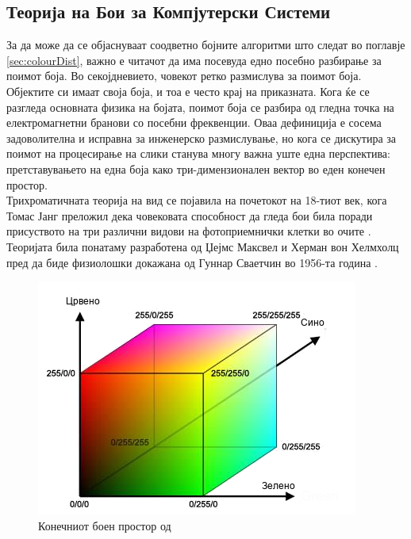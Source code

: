 \documentclass[11pt]{article}
\begin{document}
  \subsection{Теорија на Бои за Компјутерски Системи}
    \label{sec:colour_theory}
    За да може да се објаснуваат соодветно бојните алгоритми што следат во поглавје \ref{sec:colourDist}, важно е читачот да има посевуда едно посебно разбирање за поимот боја.
    Во секојдневието, човекот ретко размислува за поимот боја. Објектите си имаат своја боја, и тоа е често крај на приказната. Кога ќе се разгледа основната физика на бојата, поимот боја се разбира од гледна точка на електромагнетни бранови со посебни фреквенции. Оваа дефиниција е сосема задоволителна и исправна за инженерско размислување, но кога се дискутира за поимот на процесирање на слики станува многу важна уште една перспектива: претставувањето на една боја како три-димензионален вектор во еден конечен простор.
    \\
    Трихроматичната теорија на вид се појавила на почетокот на 18-тиот век, кога Томас Јанг преложил дека човековата способност да гледа бои била поради присуството на три различни видови на фотоприемнички клетки во очите \cite{young}. Теоријата била понатаму разработена од Џејмс Максвел и Херман вон Хелмхолц пред да биде физиолошки докажана од Гуннар Сваетчин во 1956-та година \cite{svaetchin}.
    \bigbreak
    \begin{figure}[h]
      \centering
      \includegraphics[width = 0.6\linewidth]{./images/colour_cube_mk.png}
      \caption{Конечниот боен простор од \cite{colourcube}}
      \label{fig:colour_cube}

      \end{figure}
\end{document}
